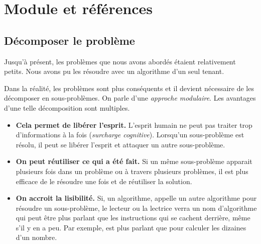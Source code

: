 \chapter{Module et références}

\minitoc

\section{Décomposer le problème}

	Jusqu’à présent, les problèmes que nous avons abordés étaient relativement
	petits.  Nous avons pu les résoudre avec un algorithme d’un seul tenant.
	
	Dans la réalité, les problèmes sont plus conséquents et il devient
	nécessaire de les décomposer en sous-problèmes.  On parle d’une
	\emph{approche modulaire}.  Les avantages d’une telle décomposition sont
	multiples.
	
	\begin{itemize}
	\item
		\textbf{Cela permet de libérer l’esprit.}
		L’esprit humain ne peut pas traiter trop d’informations à la fois
		(\emph{surcharge cognitive}).
		Lorsqu’un sous-problème est résolu,
		il peut se libérer l’esprit et attaquer un autre sous-problème.
	\item
		\textbf{On peut réutiliser ce qui a été fait.}
		Si un même sous-problème apparait plusieurs fois
		dans un problème ou à travers plusieurs problèmes,
		il est plus efficace de le résoudre une fois et
		de réutiliser la solution.
	\item
		\textbf{On accroit la lisibilité.} Si,  un algorithme, appelle un autre
		algorithme pour résoudre un sous-problème, le lecteur ou la lectrice
		verra un nom d’algorithme qui peut être plus parlant que les
		instructions qui se cachent derrière, même s’il y en a peu.  Par
		exemple,  est plus parlant que 
		pour calculer les dizaines d’un nombre.
	
\end{itemize}

